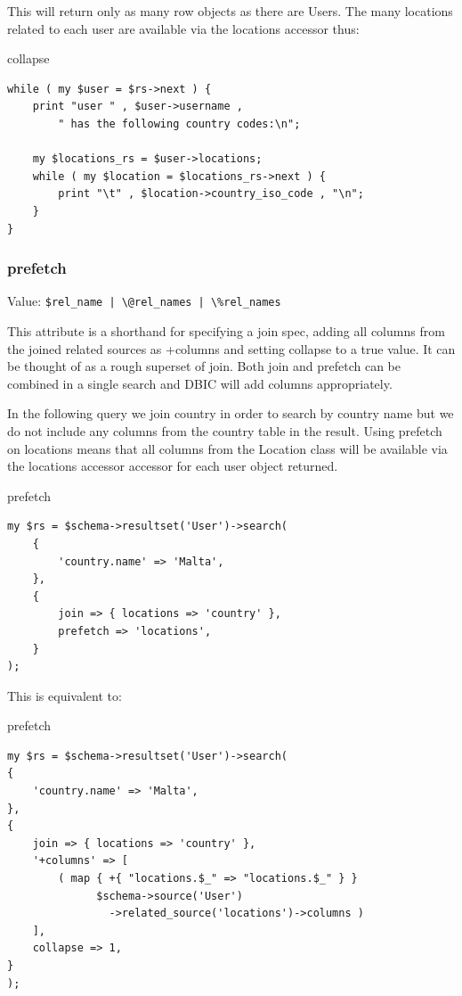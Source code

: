 This will return only as many row objects as there are Users. The many locations related to each user are available via the locations accessor thus:

\begin{frame}[fragile]{collapse}
\begin{lstlisting}
while ( my $user = $rs->next ) {
    print "user " , $user->username ,
        " has the following country codes:\n";

    my $locations_rs = $user->locations;
    while ( my $location = $locations_rs->next ) {
        print "\t" , $location->country_iso_code , "\n";
    }
}
\end{lstlisting}
\end{frame}

\subsubsection{prefetch}

Value: \verb=$rel_name | \@rel_names | \%rel_names=

This attribute is a shorthand for specifying a join spec, adding all columns
from the joined related sources as +columns and setting collapse to a true
value. It can be thought of as a rough superset of join. Both join and
prefetch can be combined in a single search and DBIC will add columns
appropriately.

In the following query we join country in order to search by country name
but we do not include any columns from the country table in the
result. Using prefetch on locations means that all columns from the Location
class will be available via the locations accessor accessor for each user
object returned.

\begin{frame}[fragile]{prefetch}
\begin{lstlisting}
my $rs = $schema->resultset('User')->search(
    {
        'country.name' => 'Malta',
    },
    {
        join => { locations => 'country' },
        prefetch => 'locations',
    }
);
\end{lstlisting}
\end{frame}

This is equivalent to:

\begin{frame}[fragile]{prefetch}
\begin{lstlisting}
my $rs = $schema->resultset('User')->search(
{
    'country.name' => 'Malta',
},
{
    join => { locations => 'country' },
    '+columns' => [
        ( map { +{ "locations.$_" => "locations.$_" } }
              $schema->source('User')
                ->related_source('locations')->columns )
    ],
    collapse => 1,
}
);
\end{lstlisting}
\end{frame}

